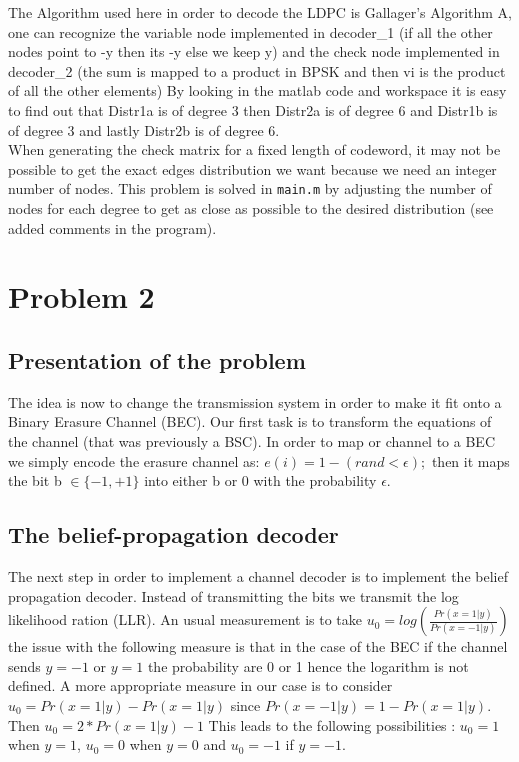\documentclass[a4paper]{article}
\begin{document}
The Algorithm used here in order to decode the LDPC is Gallager's Algorithm A, one can recognize the variable node implemented in decoder\_1 (if all the other nodes point to -y then its -y else we keep y) and the check node implemented in decoder\_2 (the sum is mapped to a product in BPSK and then vi is the product of all the other elements)
By looking in the matlab code and workspace it is easy to find out that Distr1a is of degree 3 then Distr2a is of degree 6 and Distr1b is of degree 3 and lastly Distr2b is of degree 6.\\

When generating the check matrix for a fixed length of codeword, it may not be possible to get the exact edges distribution we want because we need an integer number of nodes. This problem is solved in \verb|main.m| by adjusting the number of nodes for each degree to get as close as possible to the desired distribution (see added comments in the program).

\section{Problem 2}
\subsection{Presentation of the problem}
The idea is now to change the transmission system in order to make it fit onto a Binary Erasure Channel (BEC). Our first task is to transform the equations of the channel (that was previously a BSC). In order to map or channel to a BEC we simply encode the erasure channel as:  $e(i)= 1-(rand<\epsilon);$ then it maps the bit b $\in \{-1,+1\}$ into either b or 0 with the probability $\epsilon$.

\subsection{The belief-propagation decoder }

The next step in order to implement a channel decoder is to implement the belief propagation decoder. Instead of transmitting the bits we transmit the log likelihood ration (LLR).
An usual measurement is to take $u_0= log( \frac{Pr(x=1|y)}{Pr(x=-1|y)})$ the issue with the following measure is that in the case of the BEC if the channel sends $y=-1 $ or $y=1$ the probability are 0 or 1 hence the logarithm is not defined. A more appropriate measure in our case  is to consider $u_0= Pr(x=1|y)-Pr(x=1|y)$ since $Pr(x=-1|y)=1-Pr(x=1|y)$. Then $u_0=2*Pr(x=1|y)-1$
This leads to the following possibilities : $u_0=1$ when $y=1$, $u_0=0$ when $y=0$ and $u_0=-1$ if $y=-1$.
\end{document}
